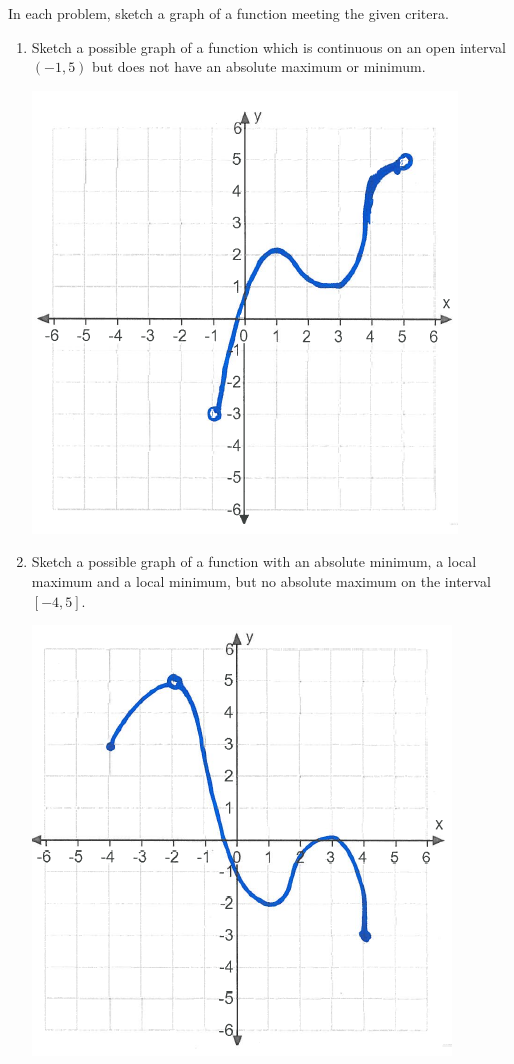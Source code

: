 \documentclass[nooutcomes]{ximera}
\begin{document}
\begin{problem}
In each problem, sketch a graph of a function meeting the given critera.
\begin{enumerate}
	\item Sketch a possible graph of a function which is continuous on an open interval $(-1,5)$ but does not have an absolute maximum or minimum.
	\begin{freeResponse} \hfil
	\begin{image}
	\includegraphics[scale=.5]{Figure5.png}
	\end{image}	
	\end{freeResponse}
	\item Sketch a possible graph of a function with an absolute minimum, a local maximum and a local minimum, but no absolute maximum on the interval $[-4,5]$.
	\begin{freeResponse} \hfil
	\begin{image}
	\includegraphics[scale=.4]{Figure6.png}

\end{image}
\end{freeResponse}
\end{enumerate}
\end{problem}
\end{document}
